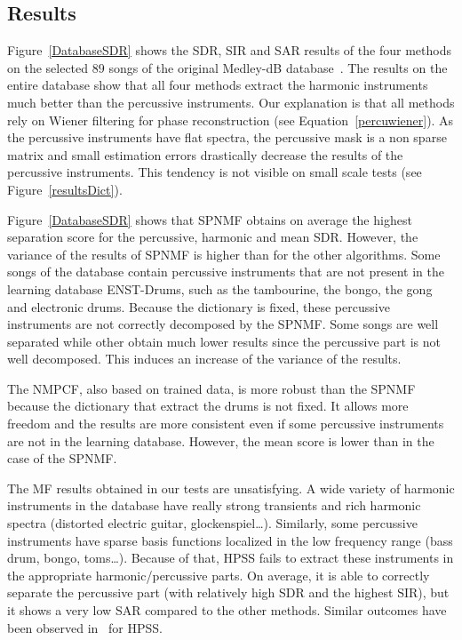 \subsection{Results} 
\label{subResults}

Figure~\ref{DatabaseSDR} shows the SDR, SIR and SAR results of the four methods on the selected $89$ songs of the original Medley-dB database~\cite{bittner2014medleydb}. The results on the entire database show that all four methods extract the harmonic instruments much better than the percussive instruments. Our explanation is that all methods rely on Wiener filtering for phase reconstruction (see Equation~\eqref{percuwiener}). As the percussive instruments have flat spectra, the percussive mask is a non sparse matrix and small estimation errors drastically decrease the results of the percussive instruments. This tendency is not visible on small scale tests (see Figure~\ref{resultsDict}). 

Figure~\ref{DatabaseSDR} shows that SPNMF obtains on average the highest separation score for the percussive, harmonic and mean SDR. However, the variance of the results of SPNMF is higher than for the other algorithms. Some songs of the database contain percussive instruments that are not present in the learning database ENST-Drums, such as the tambourine, the bongo, the gong and electronic drums. Because the dictionary is fixed, these percussive instruments are not correctly decomposed by the SPNMF. Some songs are well separated while other obtain much lower results since the percussive part is not well decomposed. This induces an increase of the variance of the results. 

The NMPCF, also based on trained data, is more robust than the SPNMF because the dictionary that extract the drums is not fixed. It allows more freedom and the results are more consistent even if some percussive instruments are not in the learning database. However, the mean score is lower than in the case of the SPNMF.

The MF results obtained in our tests are unsatisfying. A wide variety of harmonic instruments in the database have really strong transients and rich harmonic spectra (distorted electric guitar, glockenspiel\ldots). Similarly, some percussive instruments have sparse basis functions localized in the low frequency range (bass drum, bongo, toms\ldots). Because of that, HPSS fails to extract these instruments in the appropriate harmonic/percussive parts. On average, it is able to correctly separate the percussive part (with relatively high SDR and the highest SIR), but it shows a very low SAR compared to the other methods. Similar outcomes have been observed in~\cite{canadas2014percussive} for HPSS.

